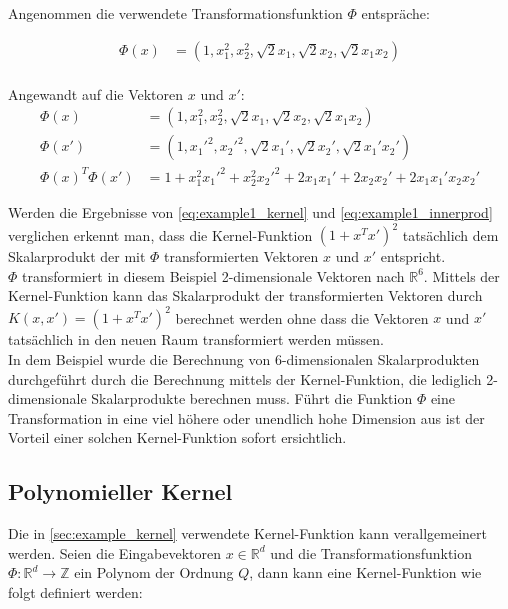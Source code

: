 \documentclass[a4paper,11pt,twoside]{scrreprt}
\begin{document}
Angenommen die verwendete Transformationsfunktion $\Phi$ entspräche:

\begin{equation}
	\begin{aligned}
		\Phi(x) &= (1, x_{1}^{2}, x_{2}^{2}, \sqrt{2} x_{1}, \sqrt{2} x_{2}, \sqrt{2} x_{1} x_{2})\\
	\end{aligned}
\end{equation}

Angewandt auf die Vektoren $x$ und $x'$:
\begin{equation} \label{eq:example1_innerprod}
	\begin{aligned}
		\Phi(x) &= (1, x_{1}^{2}, x_{2}^{2}, \sqrt{2} x_{1}, \sqrt{2} x_{2}, \sqrt{2} x_{1} x_{2})\\
		\Phi(x') &= (1, x_{1}'^{2}, x_{2}'^{2}, \sqrt{2} x_{1}', \sqrt{2} x_{2}', \sqrt{2} x_{1}' x_{2}')\\
		\Phi(x)^T \Phi(x') &= 1 + x_{1}^2 x_{1}'^2 + x_{2}^{2} x_{2}'^{2} + 2x_{1} x_{1}' + 2 x_{2} x_{2}' + 2 x_{1} x_{1}'x_{2} x_{2}'
	\end{aligned}
\end{equation}

Werden die Ergebnisse von \autoref{eq:example1_kernel} und \autoref{eq:example1_innerprod} verglichen erkennt man, dass die Kernel-Funktion $(1 + x^{T}x')^{2}$ tatsächlich dem Skalarprodukt der mit $\Phi$ transformierten Vektoren $x$ und $x'$ entspricht. \\

$\Phi$ transformiert in diesem Beispiel 2-dimensionale Vektoren nach $\mathbb{R}^6$. Mittels der Kernel-Funktion kann das Skalarprodukt der transformierten Vektoren durch $K(x, x') = (1 + x^{T}x')^{2}$ berechnet werden ohne dass die Vektoren $x$ und $x'$ tatsächlich in den neuen Raum transformiert werden müssen. \\

In dem Beispiel wurde die Berechnung von 6-dimensionalen Skalarprodukten durchgeführt durch die Berechnung mittels der Kernel-Funktion, die lediglich 2-dimensionale Skalarprodukte berechnen muss. Führt die Funktion $\Phi$ eine Transformation in eine viel höhere oder unendlich hohe Dimension aus ist der Vorteil einer solchen Kernel-Funktion sofort ersichtlich.

\subsection{Polynomieller Kernel}
Die in \autoref{sec:example_kernel} verwendete Kernel-Funktion kann verallgemeinert werden. Seien die Eingabevektoren $x \in \mathbb{R}^d$ und die Transformationsfunktion $\Phi: \mathbb{R}^d \rightarrow \mathbb{Z}$ ein Polynom der Ordnung $Q$, dann kann eine Kernel-Funktion wie folgt definiert werden:
\end{document}
